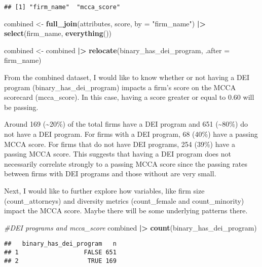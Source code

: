 \documentclass[
]{article}
\newenvironment{Shaded}{\begin{snugshade}}{\end{snugshade}}
\newcommand{\AttributeTok}[1]{\textcolor[rgb]{0.13,0.29,0.53}{#1}}
\newcommand{\CommentTok}[1]{\textcolor[rgb]{0.56,0.35,0.01}{\textit{#1}}}
\newcommand{\FunctionTok}[1]{\textcolor[rgb]{0.13,0.29,0.53}{\textbf{#1}}}
\newcommand{\NormalTok}[1]{#1}
\newcommand{\OtherTok}[1]{\textcolor[rgb]{0.56,0.35,0.01}{#1}}
\newcommand{\SpecialCharTok}[1]{\textcolor[rgb]{0.81,0.36,0.00}{\textbf{#1}}}
\newcommand{\StringTok}[1]{\textcolor[rgb]{0.31,0.60,0.02}{#1}}
\begin{document}
\begin{verbatim}
## [1] "firm_name"  "mcca_score"
\end{verbatim}

\begin{Shaded}
\begin{Highlighting}[]
\NormalTok{combined }\OtherTok{\textless{}{-}} \FunctionTok{full\_join}\NormalTok{(attributes, score, }\AttributeTok{by =} \StringTok{"firm\_name"}\NormalTok{) }\SpecialCharTok{|\textgreater{}}
  \FunctionTok{select}\NormalTok{(firm\_name, }\FunctionTok{everything}\NormalTok{()) }
   
  
\NormalTok{combined }\OtherTok{\textless{}{-}}\NormalTok{ combined }\SpecialCharTok{|\textgreater{}}
  \FunctionTok{relocate}\NormalTok{(binary\_has\_dei\_program, }\AttributeTok{.after =}\NormalTok{ firm\_name)}
\end{Highlighting}
\end{Shaded}

From the combined dataset, I would like to know whether or not having a
DEI program (binary\_has\_dei\_program) impacts a firm's score on the
MCCA scorecard (mcca\_score). In this case, having a score greater or
equal to 0.60 will be passing.

Around 169 (\textasciitilde20\%) of the total firms have a DEI program
and 651 (\textasciitilde80\%) do not have a DEI program. For firms with
a DEI program, 68 (40\%) have a passing MCCA score. For firms that do
not have DEI programs, 254 (39\%) have a passing MCCA score. This
suggests that having a DEI program does not necessarily correlate
strongly to a passing MCCA score since the passing rates between firms
with DEI programs and those without are very small.

Next, I would like to further explore how variables, like firm size
(count\_attorneys) and diversity metrics (count\_female and
count\_minority) impact the MCCA score. Maybe there will be some
underlying patterns there.

\begin{Shaded}
\begin{Highlighting}[]
\CommentTok{\#DEI programs and mcca\_score }
\NormalTok{combined }\SpecialCharTok{|\textgreater{}}
  \FunctionTok{count}\NormalTok{(binary\_has\_dei\_program)}
\end{Highlighting}
\end{Shaded}

\begin{verbatim}
##   binary_has_dei_program   n
## 1                  FALSE 651
## 2                   TRUE 169
\end{verbatim}
\end{document}
